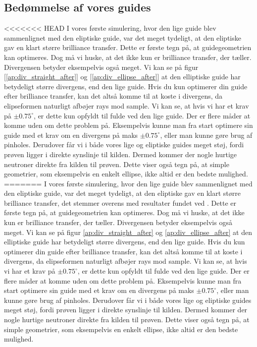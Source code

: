 \documentclass[12pt,oneside,a4paper]{article}
\begin{document}
{{{{{\subsection{Bedømmelse af vores guides}
<<<<<<< HEAD
I vores første simulering, hvor den lige guide blev sammenlignet med den eliptiske guide, var det meget tydeligt, at den eliptiske gav en klart større brilliance transfer. Dette er første tegn på, at guidegeometrien kan optimeres. Dog må vi huske, at det ikke kun er brilliance transfer, der tæller. Divergensen betyder eksempelvis også meget. Vi kan se på figur [\ref{ap:div_straight_after}] og [\ref{ap:div_ellipse_after}] at den elliptiske guide har betydeligt større divergens, end den lige guide. Hvis du kun optimerer din guide efter brilliance transfer, kan det altså komme til at koste i divergens, da elipseformen naturligt afbøjer rays mod sample. Vi kan se, at hvis vi har et krav på $\pm 0.75^\circ$, er dette kun opfyldt til fulde ved den lige guide. Der er flere måder at komme uden om dette problem på. Eksempelvis kunne man fra start optimere sin guide med et krav om en divergens på maks  $\pm 0.75^\circ$, eller man kunne gøre brug af pinholes. Derudover får vi i både vores lige og eliptiske guides meget støj, fordi prøven ligger i direkte synslinje til kilden. Dermed kommer der nogle hurtige neutroner direkte fra kilden til prøven. Dette viser også tegn på, at simple geometrier, som eksempelvis en enkelt ellipse, ikke altid er den bedste mulighed.
=======
I vores første simulering, hvor den lige guide blev sammenlignet med den eliptiske guide, var det meget tydeligt, at den eliptiske gav en klart større brilliance transfer, det stemmer overens med resultater fundet ved \cite{Kleno201275}. Dette er første tegn på, at guidegeometrien kan optimeres. Dog må vi huske, at det ikke kun er brilliance transfer, der tæller. Divergensen betyder eksempelvis også meget. Vi kan se på figur \ref{ap:div_straight_after} og \ref{ap:div_ellipse_after} at den elliptiske guide har betydeligt større divergens, end den lige guide. Hvis du kun optimerer din guide efter brilliance transfer, kan det altså komme til at koste i divergens, da elipseformen naturligt afbøjer rays mod sample. Vi kan se, at hvis vi har et krav på $\pm 0.75^\circ$, er dette kun opfyldt til fulde ved den lige guide. Der er flere måder at komme uden om dette problem på. Eksempelvis kunne man fra start optimere sin guide med et krav om en divergens på maks  $\pm 0.75^\circ$, eller man kunne gøre brug af pinholes. Derudover får vi i både vores lige og eliptiske guides meget støj, fordi prøven ligger i direkte synslinje til kilden. Dermed kommer der nogle hurtige neutroner direkte fra kilden til prøven. Dette viser også tegn på, at simple geometrier, som eksempelvis en enkelt ellipse, ikke altid er den bedste mulighed.
}}}}}
\end{document}
